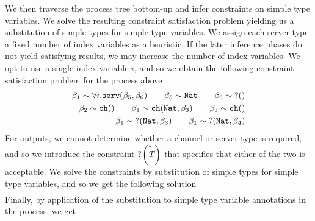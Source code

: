 We then traverse the process tree bottom-up and infer constraints on simple type variables. We solve the resulting constraint satisfaction problem yielding us a substitution of simple types for simple type variables. We assign each server type a fixed number of index variables as a heuristic. If the later inference phases do not yield satisfying results, we may increase the number of index variables. We opt to use a single index variable $i$, and so we obtain the following constraint satisfaction problem for the process above
\begin{align*}
    \beta_1 \sim \forall i.\texttt{serv}(\beta_5,\beta_6)\kern2em\beta_5 \sim \texttt{Nat}\kern2em\beta_6 \sim \;?()\\
    \beta_2 \sim \texttt{ch}()\kern2em\beta_1 \sim \texttt{ch}(\texttt{Nat},\beta_3)\kern2em \beta_3 \sim \texttt{ch}()\\
    \beta_1 \sim\; ?(\texttt{Nat},\beta_3)\kern2em \beta_1 \sim\; ?(\texttt{Nat},\beta_4)
\end{align*}
For outputs, we cannot determine whether a channel or server type is required, and so we introduce the constraint $?(\widetilde{\dot{T}})$ that specifies that either of the two is acceptable. We solve the constraints by substitution of simple types for simple type variables, and so we get the following solution
\begin{align*}
    [\beta_1 \mapsto \forall i.\texttt{serv}(\texttt{Nat},\texttt{ch}()),\beta_2 \mapsto \texttt{ch}(), \beta_3 \mapsto \texttt{ch}(), \beta_4 \mapsto \texttt{ch}()]
\end{align*}
Finally, by application of the substitution to simple type variable annotations in the process, we get
%
